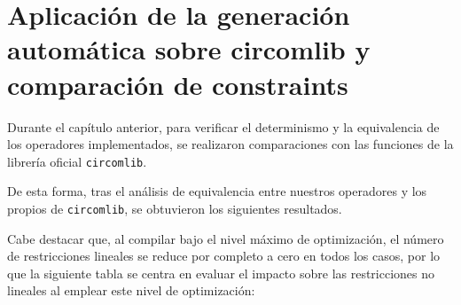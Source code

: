 \documentclass[a4paper,12pt]{report}
\begin{document}
	\section{Aplicación de la generación automática sobre circomlib y comparación de constraints}
	\vspace{0.2cm}
	\noindent Durante el capítulo anterior, para verificar el determinismo y la equivalencia de los operadores implementados, se realizaron comparaciones con las funciones de la librería oficial \texttt{circomlib}.
	
	\vspace{0.2cm}
	\noindent De esta forma, tras el análisis de equivalencia entre nuestros operadores y los propios de \texttt{circomlib}, se obtuvieron los siguientes resultados. 
	
	\vspace{0.2cm}
	\noindent Cabe destacar que, al compilar bajo el nivel máximo de optimización, el número de restricciones lineales se reduce por completo a cero en todos los casos, por lo que la siguiente tabla se centra en evaluar el impacto sobre las restricciones no lineales al emplear este nivel de optimización:
	
\end{document}

